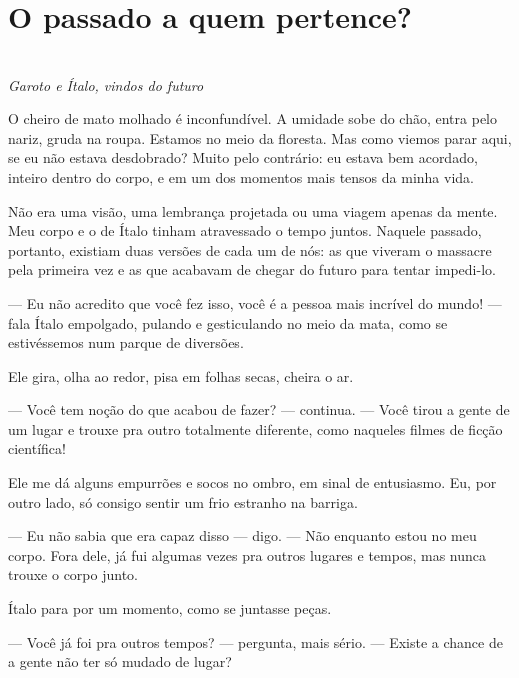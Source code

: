 \newpage


\ifdefined\useChapters
\chapter{O passado a quem pertence?}
 
\else
\chapter{}
\fi

\begin{center}
\textit{Garoto e Ítalo, vindos do futuro}
\end{center}

O cheiro de mato molhado é inconfundível. A umidade sobe do chão, entra pelo nariz, gruda na roupa. Estamos no meio da floresta.  
Mas como viemos parar aqui, se eu não estava desdobrado? Muito pelo contrário: eu estava bem acordado, inteiro dentro do corpo, e em um dos momentos mais tensos da minha vida.

Não era uma visão, uma lembrança projetada ou uma viagem apenas da mente. Meu corpo e o de Ítalo tinham atravessado o tempo juntos. Naquele passado, portanto, existiam duas versões de cada um de nós: as que viveram o massacre pela primeira vez e as que acabavam de chegar do futuro para tentar impedi-lo.

— Eu não acredito que você fez isso, você é a pessoa mais incrível do mundo! — fala Ítalo empolgado, pulando e gesticulando no meio da mata, como se estivéssemos num parque de diversões.

Ele gira, olha ao redor, pisa em folhas secas, cheira o ar.

— Você tem noção do que acabou de fazer? — continua. — Você tirou a gente de um lugar e trouxe pra outro totalmente diferente, como naqueles filmes de ficção científica!

Ele me dá alguns empurrões e socos no ombro, em sinal de entusiasmo.  
Eu, por outro lado, só consigo sentir um frio estranho na barriga.

— Eu não sabia que era capaz disso — digo. — Não enquanto estou no meu corpo.  
Fora dele, já fui algumas vezes pra outros lugares e tempos, mas nunca trouxe o corpo junto.

Ítalo para por um momento, como se juntasse peças.

— Você já foi pra outros tempos? — pergunta, mais sério. — Existe a chance de a gente não ter só mudado de lugar?

